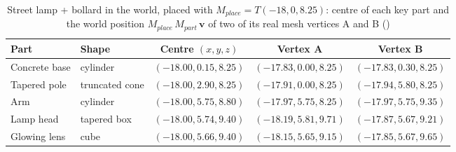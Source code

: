 \begin{table}[H]\centering\footnotesize
\caption{Street lamp + bollard in the world, placed with $M_{place}=T(-18, 0, 8.25)$: centre of each key part and the world position $M_{place}\,M_{part}\,\mathbf{v}$ of two of its real mesh vertices A and B ()}\label{tab:world_streetlamp}
\begin{tabular}{@{}l l c c c@{}}
\toprule
Part & Shape & Centre $(x,y,z)$ & Vertex A & Vertex B \\
\midrule
Concrete base & cylinder & $(-18.00, 0.15, 8.25)$ & $(-17.83, 0.00, 8.25)$ & $(-17.83, 0.30, 8.25)$ \\
Tapered pole & truncated cone & $(-18.00, 2.90, 8.25)$ & $(-17.91, 0.00, 8.25)$ & $(-17.94, 5.80, 8.25)$ \\
Arm & cylinder & $(-18.00, 5.75, 8.80)$ & $(-17.97, 5.75, 8.25)$ & $(-17.97, 5.75, 9.35)$ \\
Lamp head & tapered box & $(-18.00, 5.74, 9.40)$ & $(-18.19, 5.81, 9.71)$ & $(-17.87, 5.67, 9.21)$ \\
Glowing lens & cube & $(-18.00, 5.66, 9.40)$ & $(-18.15, 5.65, 9.15)$ & $(-17.85, 5.67, 9.65)$ \\
\bottomrule
\end{tabular}
\end{table}
